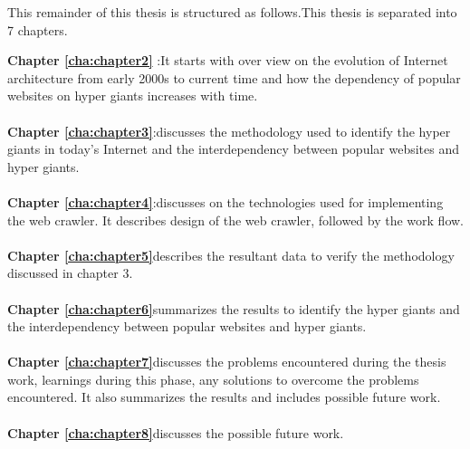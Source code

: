 This remainder of this thesis is structured as follows.This thesis is separated
into 7 chapters.

\textbf{Chapter \ref{cha:chapter2}} :It starts with over view on the evolution of Internet architecture from early 2000s to current time and how the dependency of popular websites on
hyper giants increases with time.
\\
\\
\textbf{Chapter \ref{cha:chapter3}}:discusses the methodology used to identify the hyper giants in today's Internet and the interdependency between popular websites and hyper giants.
\\
\\
\textbf{Chapter \ref{cha:chapter4}}:discusses on the technologies used for implementing the web crawler. It describes design of the web crawler, followed by the work flow. 
\\
\\
\textbf{Chapter \ref{cha:chapter5}}describes the resultant data to verify the methodology discussed in chapter 3.
\\
\\
\textbf{Chapter \ref{cha:chapter6}}summarizes the results to identify the hyper giants and the interdependency between popular websites and hyper giants.
\\
\\
\textbf{Chapter \ref{cha:chapter7}}discusses the problems encountered during the thesis work, learnings during this phase, any solutions to overcome the problems encountered. It also summarizes the results and includes possible future work. 
\\
\\
\textbf{Chapter \ref{cha:chapter8}}discusses the possible future work.

